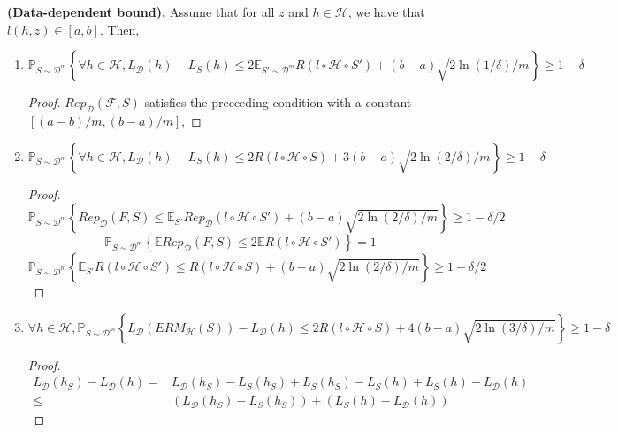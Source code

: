 \begin{theorem}
    \textbf{(Data-dependent bound).}
    Assume that for all $ z $ and $ h \in \mathcal{H} $, we have that $ l(h,z) \in [a, b] $. Then,
    \begin{enumerate}
        \item 
            \[
                \mathbb{P}_{S \sim \mathcal{D}^m} \left\{ \forall h \in \mathcal{H}, L_ \mathcal{D}(h) - L_S (h) \le 2 \mathbb{E}_{S'\sim \mathcal{D}^m} R( l\circ \mathcal{H}\circ S') + (b-a) \sqrt{2\ln(1/\delta)/m} \right\} \ge 1-\delta
            \]
            \begin{proof}
                $ Rep_ \mathcal{D}( \mathcal{F}, S) $ satisfies the preceeding condition with a constant $ [(a-b)/m, (b-a)/m] $,
            \end{proof}
        \item  
            \[
                \mathbb{P} _{S \sim \mathcal{D}^m} \left\{ \forall h \in \mathcal{H}, L_ \mathcal{D}(h) - L_S (h) \le 2 R( l\circ \mathcal{H}\circ S) + 3(b-a) \sqrt{2 \ln(2/\delta)/m} \right\} \ge 1-\delta
            \]
            \begin{proof}
                \[
                    \mathbb{P}_{S \sim \mathcal{D}^m} \left\{ Rep_ \mathcal{D}(F, S) \le \mathbb{E}_{S'} Rep_ \mathcal{D}( l\circ \mathcal{H}\circ S') + (b-a) \sqrt{2 \ln(2/\delta)/m} \right\} \ge 1-\delta/2
                \]
                \[
                    \mathbb{P} _{S \sim \mathcal{D}^m} \left\{ \mathbb{E}Rep_ \mathcal{D}(F, S) \le 2 \mathbb{E}R(l\circ \mathcal{H}\circ S') \right\} = 1
                \]
                \[
                    \mathbb{P} _{S \sim \mathcal{D}^m} \left\{ \mathbb{E}_{S'} R( l\circ \mathcal{H}\circ S') \le R( l\circ \mathcal{H} \circ S) + (b-a) \sqrt{2 \ln(2/\delta)/m} \right\} \ge 1-\delta/2
                \]
            \end{proof}
        \item 
            \[
                \forall h \in \mathcal{H}, \mathbb{P} _{S \sim \mathcal{D}^m} \left\{ L_ \mathcal{D}(ERM_ \mathcal{H}(S)) - L_\mathcal{D} (h) \le 2 R( l\circ \mathcal{H}\circ S) + 4(b-a) \sqrt{2 \ln(3/\delta)/m} \right\} \ge 1-\delta
            \]
            \begin{proof}
                \begin{align*}
                    L_ \mathcal{D}(h_S) - L_ \mathcal{D}(h)
                    =& L_ \mathcal{D}(h_S) - L_S(h_S) + L_S(h_S) - L_S(h) + L_S(h) - L_ \mathcal{D}(h)\\
                    \le& (L_ \mathcal{D}(h_S) - L_S(h_S)) + (L_S(h) - L_ \mathcal{D}(h))

\end{align*}
\end{proof}
\end{enumerate}
\end{theorem}
